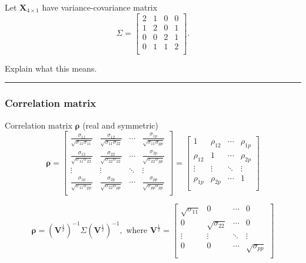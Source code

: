 \documentclass[]{article}
\begin{document}
Let \(\mathbf{X}_{4\times 1}\) have variance-covariance matrix
\[\Sigma= \left[ \begin{array}{cccc} 2&1&0&0\\
      1&2&0&1\\
      0&0&2&1\\
      0&1&1&2\\
          \end{array}
          \right].\]

Explain what this means.

\begin{center}\rule{0.5\linewidth}{\linethickness}\end{center}

\hypertarget{correlation-matrix}{%
\subsubsection{Correlation matrix}\label{correlation-matrix}}

Correlation matrix \(\mathbf{\rho}\) (real and symmetric)
\[\mathbf{\rho}=\left[ \begin{array}{cccc}
    \frac{\sigma_{11}}{\sqrt{\sigma_{11}\sigma_{11}}} &
    \frac{\sigma_{12}}{\sqrt{\sigma_{11}\sigma_{22}}} &
    \cdots &
    \frac{\sigma_{1p}}{\sqrt{\sigma_{11}\sigma_{pp}}}\\
    \frac{\sigma_{12}}{\sqrt{\sigma_{11}\sigma_{22}}} &
    \frac{\sigma_{22}}{\sqrt{\sigma_{22}\sigma_{22}}} &
    \cdots &
    \frac{\sigma_{2p}}{\sqrt{\sigma_{22}\sigma_{pp}}}\\
    \vdots & \vdots & \ddots & \vdots\\
      \frac{\sigma_{1p}}{\sqrt{\sigma_{11}\sigma_{pp}}} &
    \frac{\sigma_{2p}}{\sqrt{\sigma_{22}\sigma_{pp}}} &
    \cdots &
    \frac{\sigma_{pp}}{\sqrt{\sigma_{pp}\sigma_{pp}}}\\ \end{array}\right]=
 \left[ \begin{array}{cccc}
    1 & \rho_{12} & \cdots & \rho_{1p}\\
    \rho_{12} & 1 & \cdots & \rho_{2p}\\
    \vdots & \vdots & \ddots & \vdots\\
    \rho_{1p} & \rho_{2p} & \cdots & 1\\
\end{array}\right]\]

\[\mathbf{\rho}=(\mathbf{V}^{\frac{1}{2}})^{-1}
    \Sigma(\mathbf{V}^{\frac{1}{2}})^{-1}, \text{   where    }
   \mathbf{V}^{\frac{1}{2}}=
 \left[ \begin{array}{cccc}
    \sqrt{\sigma_{11}} & 0& \cdots & 0\\
    0 & \sqrt{\sigma_{22}} & \cdots & 0\\
    \vdots & \vdots & \ddots & \vdots\\
    0 & 0 & \cdots & \sqrt{\sigma_{pp}}\\
\end{array} \right]\]
\end{document}
